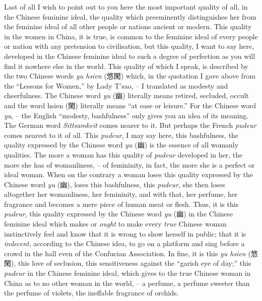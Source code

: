 Last of all I wish to point out to you here the most important quality of all,
in the Chinese feminine ideal, the quality which preeminently distinguishes her from the feminine ideal of all other people or nations ancient or modern.
This quality in the women in China, it is true, is common to the feminine ideal of every people or nation with any pretension to civilisation,
but this quality, I want to say here, developed in the Chinese feminine ideal to such a degree of perfection as you will find it nowhere else in the world.
This quality of which I speak, is described by the two Chinese words \emph{yu hsien} (悠閑)
which, in the quotation I gave above from the ``Lessons for Women,'' by Lady T'sao,
-- I translated as modesty and cheerfulness.
The Chinese word \emph{yu} (幽) literally means retired, secluded, occult and the word hsien (閑) literally means ``at ease or leisure.''
For the Chinese word \emph{yu},
-- the English ``modesty, bashfulness'' only gives you an idea of its meaning.
The German word \emph{Sittsamkeit} comes nearer to it. But perhaps the French \emph{pudeur} comes nearest to it of all.
This \emph{pudeur}, I may say here, this bashfulness, the quality expressed by the Chinese word \emph{yu} (幽) is the essence of all womanly qualities.
The more a woman has this quality of \emph{pudeur} developed in her,
the more she has of womanliness,
-- of femininity, in fact, the more she is a perfect or ideal woman.
When on the contrary a woman loses this quality expressed by the Chinese word \emph{yu} (幽),
loses this bashfulness, this \emph{pudeur}, she then loses altogether her womanliness, her femininity,
and with that, her perfume, her fragrance and becomes a mere piece of human meat or flesh.
Thus, it is this \emph{pudeur}, this quality expressed by the Chinese word \emph{yu} (幽) in the Chinese feminine ideal
which makes or \emph{ought} to make every \emph{true} Chinese woman instinctively feel and know that it is wrong to show herself in public;
that it is \emph{indecent}, according to the Chinese idea,
to go on a platform and sing before a crowd in the hall even of the Confucian Association.
In fine, it is this \emph{yu hsien} (悠閑), this love of seclusion, this sensitiveness against the ``garish eye of day;''
this \emph{pudeur} in the Chinese feminine ideal,
which gives to the true Chinese woman in China as to no other woman in the world,
-- a perfume, a perfume sweeter than the perfume of violets, the ineffable fragrance of orchids.

